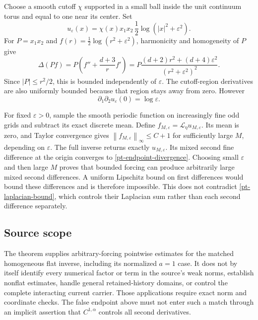 \documentclass[11pt]{article}
\newcommand{\norm}[1]{\left\lVert#1\right\rVert}
\begin{document}
Choose a smooth cutoff $\chi$ supported in a small ball inside the
unit continuum torus and equal to one near its center. Set
\begin{equation}\label{pt-endpoint-example}
 u_\varepsilon(x)=\chi(x)x_1x_2\,
                       \frac12\log(|x|^2+\varepsilon^2).
\end{equation}
For $P=x_1x_2$ and $f(r)=\frac12\log(r^2+\varepsilon^2)$,
harmonicity and homogeneity of $P$ give
\begin{equation}\label{pt-endpoint-laplacian}
 \Delta(Pf)=P\left(f''+\frac{d+3}{r}f'\right)
   =P\frac{(d+2)r^2+(d+4)\varepsilon^2}
                  {(r^2+\varepsilon^2)^2}.
\end{equation}
Since $|P|\le r^2/2$, this is bounded independently of $\varepsilon$.
The cutoff-region derivatives are also uniformly bounded because
that region stays away from zero. However
\begin{equation}\label{pt-endpoint-divergence}
 \partial_1\partial_2u_\varepsilon(0)=\log\varepsilon.
\end{equation}

For fixed $\varepsilon>0$, sample the smooth periodic function on
increasingly fine odd grids and subtract its exact discrete mean.
Define $f_{M,\varepsilon}=\mathcal L_\eta u_{M,\varepsilon}$.
Its mean is zero, and Taylor convergence gives
$\norm{f_{M,\varepsilon}}_\infty\le C+1$ for sufficiently large
$M$, depending on $\varepsilon$. The full inverse returns exactly
$u_{M,\varepsilon}$. Its mixed second fine difference at the origin
converges to \eqref{pt-endpoint-divergence}. Choosing small
$\varepsilon$ and then large $M$ proves that bounded forcing can
produce arbitrarily large mixed second differences. A uniform
Lipschitz bound on first differences would bound these differences
and is therefore impossible. This does not contradict
\eqref{pt-laplacian-bound}, which controls their Laplacian sum rather
than each second difference separately.

\subsection{Source scope}

The theorem supplies arbitrary-forcing pointwise estimates for the
matched homogeneous flat inverse, including its normalized $a=1$
case. It does not by itself identify every numerical factor or term
in the source's weak norms, establish nonflat estimates, handle
general retained-history domains, or control the complete interacting
current carrier. Those applications require exact norm and coordinate
checks. The false endpoint above must not enter such a match through
an implicit assertion that $C^{1,\alpha}$ controls all second derivatives.
\end{document}
